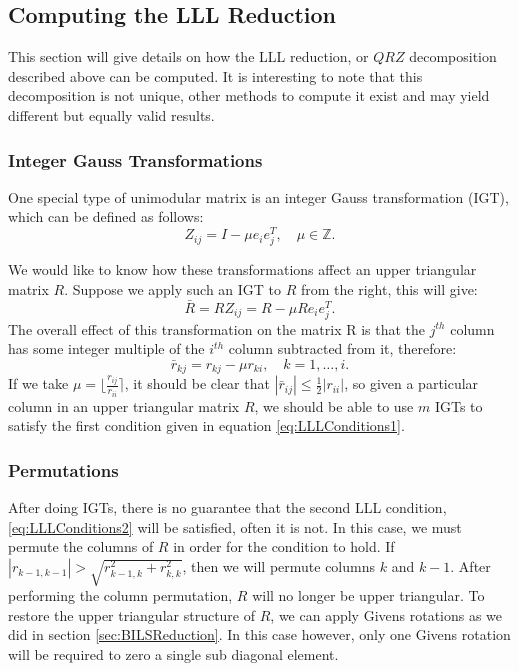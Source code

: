 \documentclass[12pt,Bold,letterpaper]{mcgilletdclass}
\newcommand{\vsp}{\vspace{\baselineskip}}
\begin{document}
\vsp \subsection{Computing the LLL Reduction}
This section will give details on how the LLL reduction, or $QRZ$ decomposition described above can be computed. It is interesting to note that this decomposition is not unique, other methods to compute it exist and may yield different but equally valid results.

\vsp \subsubsection{Integer Gauss Transformations} \label{subsec:IGT}

One special type of unimodular matrix is an integer Gauss transformation (IGT), which can be defined as follows:
\begin{equation}
Z_{ij} = I-\mu e_ie_j^T, \quad \mu \in \mathbb{Z}.
\end{equation}

We would like to know how these transformations affect an upper triangular matrix $R$. Suppose we apply such an IGT to $R$ from the right, this will give:
\begin{equation}
\bar{R} = RZ_{ij} = R - \mu Re_ie_j^T.
\end{equation}
The overall effect of this transformation on the matrix R is that the $j^{th}$ column has some integer multiple of the $i^{th}$ column subtracted from it, therefore:
\begin{equation}
\bar{r}_{kj} = r_{kj} - \mu r_{ki}, \quad k=1 , \dots, i.
\end{equation}
If we take $\mu = \lfloor \frac{r_{ij}}{r_{ii}} \rceil$, it should be clear that $|\bar{r}_{ij}| \le \frac{1}{2}|r_{ii}|$, so given a particular column in an upper triangular matrix $R$, we should be able to use $m$ IGTs to satisfy the first condition given in equation \eqref{eq:LLLConditions1}.

\vsp \subsubsection{Permutations} \label{subsec:Perm}
After doing IGTs, there is no guarantee that the second LLL condition, \eqref{eq:LLLConditions2} will be satisfied, often it is not. In this case, we must permute the columns of $R$ in order for the condition to hold. If $|r_{k-1,k-1}| > \sqrt{r^2_{k-1,k} + r^2_{k,k}}$, then we will permute columns $k$ and $k-1$. After performing the column permutation, $R$ will no longer be upper triangular. To restore the upper triangular structure of $R$, we can apply Givens rotations as we did in section \ref{sec:BILSReduction}. In this case however, only one Givens rotation will be required to zero a single sub diagonal element.
\end{document}
